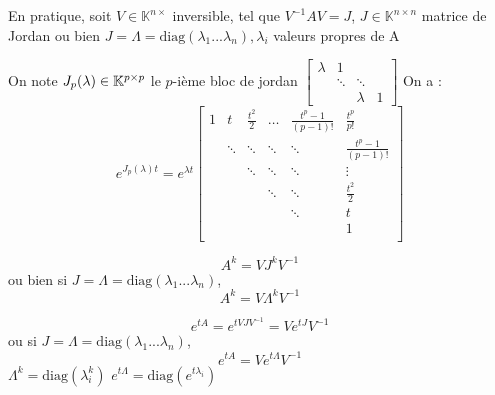 \documentclass[main.tex]{subfiles}
\begin{document}
En pratique, soit $V\in \mathbb{K}^{n\times }$ inversible, tel que $V^{-1}AV = J$, $J\in \mathbb{K}^{n \times n}$ matrice de Jordan ou bien $J = \Lambda = \text{diag}(\lambda_1...\lambda_n), \lambda_i$ valeurs propres de A
\begin{thm}
  On note $J_p(\lambda) \in \mathbb{K}^{p\times p}$ le $p$-ième bloc de jordan $
  \begin{bmatrix}
    \lambda & 1&  & \\
      & \ddots & \ddots & \\
      &    & \lambda & 1
    \end{bmatrix}$
    On a :
    \[
      e^{J_p(\lambda)t} = e^{\lambda t}
      \begin{bmatrix}
  1 & t & \frac{t^2}{2} & \dots & \frac{t^p-1}{(p-1)!}&\frac{t^p}{p!} \\
    & \ddots & \ddots            & \ddots     &  \ddots             &\frac{t^p-1}{(p-1)!}\\
    &   & \ddots             & \ddots     &  \ddots      & \vdots       \\
    &   &               & \ddots     & \ddots       &  \frac{t^2}{2}\\
    &   &               &       &  \ddots      &   t\\
    &   &               &       &         & 1 \\
      \end{bmatrix}
    \]
\end{thm}

\begin{prop}
\[A^k = V J^k V^{-1}\] ou bien si $J = \Lambda = \text{diag}(\lambda_1...\lambda_n)$, \[A^k = V \Lambda^k V^{-1} \]

\[ e^{tA} = e^{tVJV^{-1}} = V e^{tJ} V^{-1} \]
ou si $J = \Lambda = \text{diag}(\lambda_1...\lambda_n)$,
\[ e^{tA} = V e^{t\Lambda}V^{-1} \]
$\Lambda^k = \text{diag}(\lambda_i^k)$
$e^{t\Lambda} = \text{diag}(e^{t\lambda_i})$
\end{prop}
\end{document}
